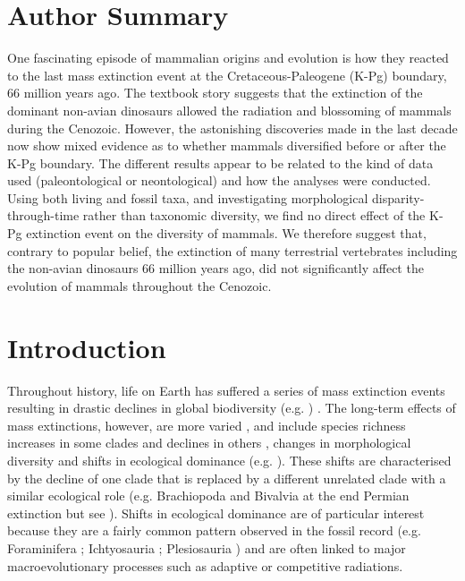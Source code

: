 \documentclass[10pt,letterpaper]{article}
\begin{document}
\section*{Author Summary}
One fascinating episode of mammalian origins and evolution is how they reacted to the last mass extinction event at the Cretaceous-Paleogene (K-Pg) boundary, 66 million years ago.
The textbook story suggests that the extinction of the dominant non-avian dinosaurs allowed the radiation and blossoming of mammals during the Cenozoic.
However, the astonishing discoveries made in the last decade now show mixed evidence as to whether mammals diversified before or after the K-Pg boundary.
The different results appear to be related to the kind of data used (paleontological or neontological) and how the analyses were conducted.
Using both living and fossil taxa, and investigating morphological disparity-through-time rather than taxonomic diversity, we find no direct effect of the K-Pg extinction event on the diversity of mammals. 
We therefore suggest that, contrary to popular belief, the extinction of many terrestrial vertebrates including the non-avian dinosaurs 66 million years ago, did not significantly affect the evolution of mammals throughout the Cenozoic.

\linenumbers

\section*{Introduction}
Throughout history, life on Earth has suffered a series of mass extinction events resulting in drastic declines in global biodiversity (e.g. \cite{RaupPT,BentonPT,rennetime2013,Brusatte2015}) .
The long-term effects of mass extinctions, however, are more varied \cite{Erwin1998344}, and include species richness increases in some clades \cite{friedmanexplosive2010} and declines in others \cite{Benton85}, changes in morphological diversity \cite{Ciampaglio2001,Ciampaglio2004,kornextinction2013} and shifts in ecological dominance (e.g. \cite{Brusatte12092008,toljagictriassic-jurassic2013,bensonfaunal2014}).
These shifts are characterised by the decline of one clade that is replaced by a different unrelated clade with a similar ecological role (e.g. Brachiopoda and Bivalvia at the end Permian extinction \cite{Liow2015} but see \cite{Payne22052014}). 
Shifts in ecological dominance are of particular interest because they are a fairly common pattern observed in the fossil record (e.g. Foraminifera \cite{Coxall01042006}; Ichtyosauria \cite{thorneresetting2011}; Plesiosauria \cite{bensonfaunal2014}) and are often linked to major macroevolutionary processes such as adaptive \cite{Losos2010} or competitive \cite{Brusatte12092008} radiations.
\end{document}
